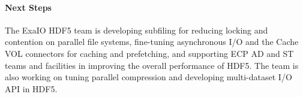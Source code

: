 
\paragraph{Next Steps}

The ExaIO HDF5 team is developing subfiling for reducing locking and contention on parallel file systems,  fine-tuning asynchronous I/O and the Cache VOL connectors for caching and prefetching, and supporting ECP AD and ST teams and facilities in improving the overall performance of HDF5. The team is also working on tuning parallel compression and developing multi-dataset I/O API in HDF5. 
